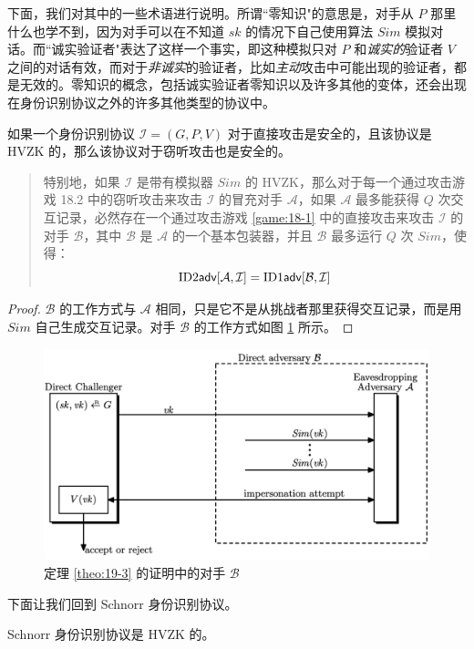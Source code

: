下面，我们对其中的一些术语进行说明。所谓``零知识"的意思是，对手从 $P$ 那里什么也学不到，因为对手可以在不知道 $sk$ 的情况下自己使用算法 $Sim$ 模拟对话。而``诚实验证者"表达了这样一个事实，即这种模拟只对 $P$ 和\emph{诚实的}验证者 $V$ 之间的对话有效，而对于\emph{非诚实}的验证者，比如\emph{主动}攻击中可能出现的验证者，都是无效的。零知识的概念，包括诚实验证者零知识以及许多其他的变体，还会出现在身份识别协议之外的许多其他类型的协议中。

\begin{theorem}\label{theo:19-3}
	如果一个身份识别协议 $\mathcal{I}=(G,P,V)$ 对于直接攻击是安全的，且该协议是 HVZK 的，那么该协议对于窃听攻击也是安全的。
	\begin{quote}
		特别地，如果 $\mathcal{I}$ 是带有模拟器 ${Sim}$ 的 HVZK，那么对于每一个通过攻击游戏 18.2 中的窃听攻击来攻击 $\mathcal{I}$ 的冒充对手 $\mathcal{A}$，如果 $\mathcal{A}$ 最多能获得 $Q$ 次交互记录，必然存在一个通过攻击游戏 \ref{game:18-1} 中的直接攻击来攻击 $\mathcal{I}$ 的对手 $\mathcal{B}$，其中 $\mathcal{B}$ 是 $\mathcal{A}$ 的一个基本包装器，并且 $\mathcal{B}$ 最多运行 $Q$ 次 ${Sim}$，使得：
		$${\rm ID2\mathsf{adv}}[\mathcal{A},\mathcal{I}]=
			{\rm ID1\mathsf{adv}}[\mathcal{B},\mathcal{I}]$$
	\end{quote}
\end{theorem}

\begin{proof}
	$\mathcal{B}$ 的工作方式与 $\mathcal{A}$ 相同，只是它不是从挑战者那里获得交互记录，而是用 ${Sim}$ 自己生成交互记录。对手 $\mathcal{B}$ 的工作方式如图 \ref{fig:19-2} 所示。
\end{proof}

\begin{figure}
  \centering
  \includegraphics[width=0.65\linewidth]{figures/chapter19/fig2.png}
  \caption{定理 \ref{theo:19-3} 的证明中的对手 $\mathcal{B}$}
  \label{fig:19-2}
\end{figure}

下面让我们回到 Schnorr 身份识别协议。

\begin{theorem}\label{theo:19-4}
	Schnorr 身份识别协议是 HVZK 的。
\end{theorem}

